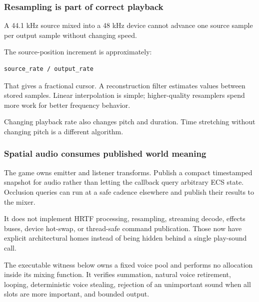 \subsubsection{Resampling is part of correct playback}\label{05-engine-i-ch009-resampling-is-part-of-correct-playback}

\hypertarget{05-engine-i-ch009-resampling-is-part-of-correct-playback}{}

A 44.1 kHz source mixed into a 48 kHz device cannot advance one source sample per output sample without changing speed.

The source-position increment is approximately:

\begin{verbatim}
source_rate / output_rate
\end{verbatim}

That gives a fractional cursor. A reconstruction filter estimates values between stored samples. Linear interpolation is simple; higher-quality resamplers spend more work for better frequency behavior.

Changing playback rate also changes pitch and duration. Time stretching without changing pitch is a different algorithm.

\subsubsection{Spatial audio consumes published world meaning}\label{05-engine-i-ch009-spatial-audio-consumes-published-world-meaning}

\hypertarget{05-engine-i-ch009-spatial-audio-consumes-published-world-meaning}{}

The game owns emitter and listener transforms. Publish a compact timestamped snapshot for audio rather than letting the callback query arbitrary ECS state. Occlusion queries can run at a safe cadence elsewhere and publish their results to the mixer.

It does not implement HRTF processing, resampling, streaming decode, effects buses, device hot-swap, or thread-safe command publication. Those now have explicit architectural homes instead of being hidden behind a single play-sound call.

The executable witness below owns a fixed voice pool and performs no allocation inside its mixing function. It verifies summation, natural voice retirement, looping, deterministic voice stealing, rejection of an unimportant sound when all slots are more important, and bounded output.

